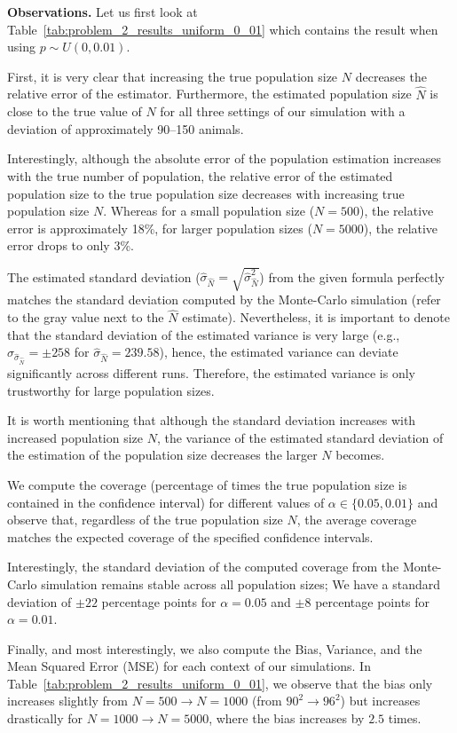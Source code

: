 \textbf{Observations.}
Let us first look at Table~\ref{tab:problem_2_results_uniform_0_01} which contains the result when using $p\sim U(0, 0.01)$.

First, it is very clear that increasing the true population size $N$ decreases the relative error of the estimator. 
Furthermore, the estimated population size $\hat{N}$ is close to the true value of $N$ for all three settings of our simulation with a deviation of approximately 90--150 animals. 

Interestingly, although the absolute error of the population estimation increases with the true number of population, the relative error of the estimated population size to the true population size decreases with increasing true population size $N$. Whereas for a small population size ($N=500$), the relative error is approximately 18\%, for larger population sizes ($N=5000$), the relative error drops to only 3\%.

The estimated standard deviation ($\hat{\sigma}_{\hat{N}} = \sqrt{\hat{\sigma}_{\hat{N}}^2}$) from the given formula perfectly matches the standard deviation computed by the Monte-Carlo simulation (refer to the gray value next to the $\hat{N}$ estimate).
Nevertheless, it is important to denote that the standard deviation of the estimated variance is very large (e.g., $\sigma_{\hat{\sigma}_{\hat{N}}} = \pm 258$ for $\hat{\sigma}_{\hat{N}} = 239.58$), hence, the estimated variance can deviate significantly across different runs. Therefore, the estimated variance is only trustworthy for large population sizes.

It is worth mentioning that although the standard deviation increases with increased population size $N$, the variance of the estimated standard deviation of the estimation of the population size decreases the larger $N$ becomes. 

We compute the coverage (percentage of times the true population size is contained in the confidence interval) for different values of $\alpha\in \{0.05, 0.01\}$ and observe that, regardless of the true population size $N$, the average coverage matches the expected coverage of the specified confidence intervals.

Interestingly, the standard deviation of the computed coverage from the Monte-Carlo simulation remains stable across all population sizes; We have a standard deviation of $\pm 22$ percentage points for $\alpha=0.05$ and $\pm 8$ percentage points for $\alpha = 0.01$.

Finally, and most interestingly, we also compute the Bias, Variance, and the Mean Squared Error (MSE) for each context of our simulations.
In Table~\ref{tab:problem_2_results_uniform_0_01}, we observe that the bias only increases slightly from $N=500 \to N=1000$ (from $90^2 \to 96^2$) but increases drastically for $N=1000 \to N=5000$, where the bias increases by $2.5$ times.

